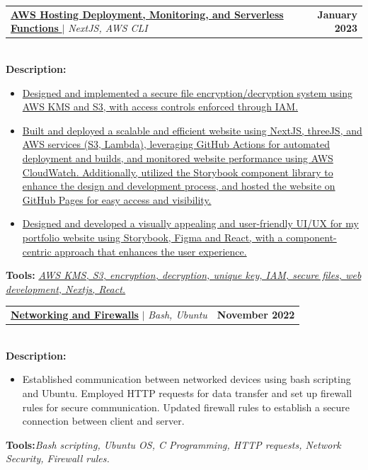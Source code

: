 \documentclass[letterpaper,11pt]{article}
\makeatletter
\newcommand{\resumeItem}[1]{
  \item\small{
    {#1 \vspace{-2pt}}
  }
}
\newcommand{\resumeProjectHeading}[2]{
    \item
    \begin{tabular*}{1.001\textwidth}{l@{\extracolsep{\fill}}r}
      \small#1 & \textbf{\small #2}\\
    \end{tabular*}\vspace{-7pt}
}
\newcommand{\resumeItemListStart}{\begin{itemize}}
\newcommand{\resumeItemListEnd}{\end{itemize}\vspace{-5pt}}
\makeatother
\begin{document}
          \resumeProjectHeading
          {\href{https://yakkshit.com}{\textbf{AWS Hosting Deployment, Monitoring, and Serverless Functions }} $|$ \emph{NextJS, AWS CLI} \faGithub}{January 2023}\\
          \vspace{6pt}
          \textbf{Description:} 
          \vspace{-5pt}
          \resumeItemListStart
            \resumeItem{\href{https://yakkshit.com}{Designed and implemented a secure file encryption/decryption system using AWS KMS and S3, with access controls enforced through IAM.}}
            \resumeItem{\href{https://yakkshit.com}{Built and deployed a scalable and efficient website using NextJS, threeJS, and AWS services (S3, Lambda), leveraging GitHub Actions for automated deployment and builds, and monitored website performance using AWS CloudWatch. Additionally, utilized the Storybook component library to enhance the design and development process, and hosted the website on GitHub Pages for easy access and visibility.}}
            \resumeItem{\href{https://yakkshit.com}{Designed and developed a visually appealing and user-friendly UI/UX for my portfolio website using Storybook, Figma and React, with a component-centric approach that enhances the user experience.}}
          \resumeItemListEnd
          \vspace{-2pt}
          \textbf{Tools:}\emph{ \href{https://yakkshit.com}{AWS KMS, S3, encryption, decryption, unique key, IAM, secure files, web development, Nextjs, React.}}




                

\resumeProjectHeading
          {\textbf{\href{https://github.com/saiyakkshit?tab=repositories}{Networking and Firewalls}} $|$ \emph{Bash, Ubuntu \faGithub}}{November 2022}\\
          \vspace{6pt}
          \textbf{Description:}
           \vspace{-5pt}
          \resumeItemListStart
          \resumeItem{Established communication between networked devices using bash scripting and Ubuntu. Employed HTTP requests for data transfer and set up firewall rules for secure communication. Updated firewall rules to establish a secure connection between client and server.}
          \resumeItemListEnd 
          \textbf{Tools:}\emph{Bash scripting,
Ubuntu OS,
C Programming,
HTTP requests, Network Security,
Firewall rules.}
\end{document}
